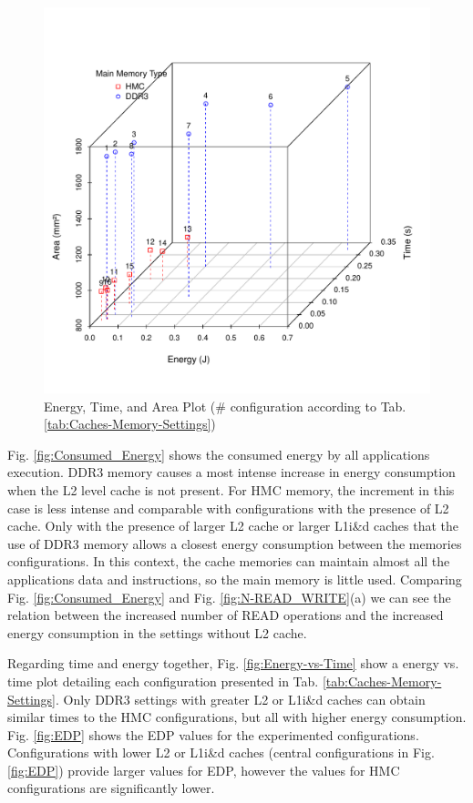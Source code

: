 \documentclass{sig-alternate-05-2015}
\begin{document}
\begin{figure}
	\centering
\includegraphics[scale=0.38]{images/graficos/EDAP}

\caption{\label{fig:EnergyTimeArea}Energy, Time, and Area Plot (\# configuration
according to Tab. \ref{tab:Caches-Memory-Settings})}
\end{figure}

Fig. \ref{fig:Consumed_Energy} shows the consumed energy by all applications execution. DDR3 memory causes a most intense increase in energy consumption when the L2 level cache is not present. For HMC memory, the increment in this case is less intense and comparable with configurations with the presence of L2 cache. Only with the presence of larger L2 cache or larger L1i\&d caches that the use of DDR3 memory allows a closest energy consumption between the memories configurations. In this context, the cache memories can maintain almost all the applications data and instructions, so the main memory is little used. Comparing Fig. \ref{fig:Consumed_Energy} and Fig. \ref{fig:N-READ_WRITE}(a) we can see the relation between the increased number of READ operations and the increased energy consumption in the settings without L2 cache.

Regarding time and energy together, Fig. \ref{fig:Energy-vs-Time} show a energy vs. time plot detailing each configuration presented in Tab. \ref{tab:Caches-Memory-Settings}. Only DDR3 settings with greater L2 or L1i\&d caches can obtain similar times to the HMC configurations, but all with higher energy consumption. Fig. \ref{fig:EDP} shows the EDP values for the experimented configurations. Configurations with lower L2 or L1i\&d caches (central configurations in Fig. \ref{fig:EDP}) provide larger values for EDP, however the values for HMC configurations are significantly lower.
\end{document}
